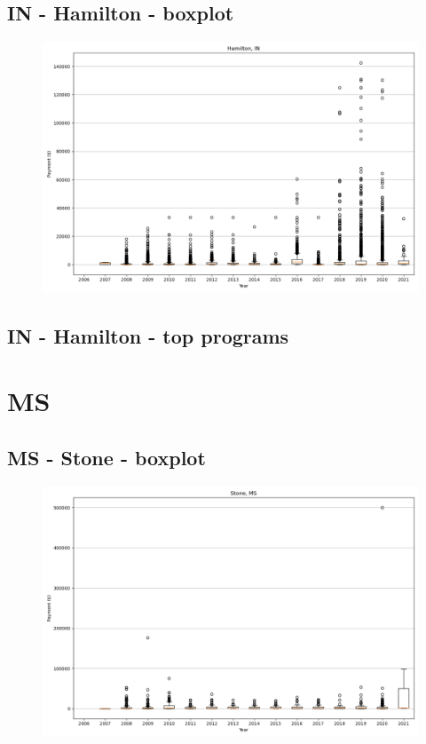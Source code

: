 \subsection*{IN - Hamilton - boxplot}
\begin{figure}[h]
\centering
\includegraphics[width=7in]{../output/boxplots/counties/Hamilton-IN_boxplot.png}
\end{figure}


\subsection*{IN - Hamilton - top programs}

\newpage
\section*{MS}
\subsection*{MS - Stone - boxplot}
\begin{figure}[h]
\centering
\includegraphics[width=7in]{../output/boxplots/counties/Stone-MS_boxplot.png}
\end{figure}


